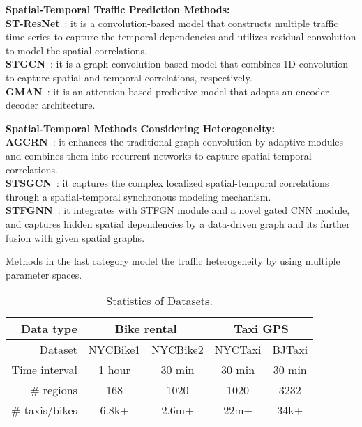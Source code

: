 \documentclass[letterpaper]{article} \usepackage{aaai23}  \usepackage{times}  \usepackage{helvet}  \usepackage{courier}  \usepackage[hyphens]{url}  \usepackage{graphicx} \urlstyle{rm} \def\UrlFont{\rm}  \usepackage{natbib}  \usepackage{caption} \frenchspacing  \setlength{\pdfpagewidth}{8.5in} \setlength{\pdfpageheight}{11in}
\newcommand{\bitem}[1]{\noindent \textbf{#1}}
\begin{document}
{\bf \noindent Spatial-Temporal Traffic Prediction Methods:}\\
\bitem{ST-ResNet}~\cite{zhang2017deep}: it is a convolution-based model that constructs multiple traffic time series to capture the temporal dependencies and utilizes residual convolution to model the spatial correlations.\\
\bitem{STGCN}~\cite{yu2018spatio}: it is a graph convolution-based model that combines 1D convolution to capture spatial and temporal correlations, respectively.\\
\bitem{GMAN}~\cite{zheng2020gman}: it is an attention-based predictive model that adopts an encoder-decoder architecture.\\\vspace{-0.12in}

{\bf \noindent Spatial-Temporal Methods Considering Heterogeneity:}\\
\bitem{AGCRN}~\cite{bai2020adaptive}: it enhances the traditional graph convolution by adaptive modules and combines them into recurrent networks to capture spatial-temporal correlations.\\
\bitem{STSGCN}~\cite{song2020spatial}: it captures the complex localized spatial-temporal correlations through a spatial-temporal synchronous modeling mechanism.\\
\bitem{STFGNN}~\cite{li2021spatial}: it integrates with STFGN module and a novel gated CNN module, and captures hidden spatial dependencies by a data-driven graph and its further fusion with given spatial graphs.

Methods in the last category model the traffic heterogeneity by using multiple parameter spaces.



\begin{table}[t]\small
    \centering
    \setlength{\tabcolsep}{1.5mm}
    \begin{tabular}{rcccc}
      \toprule 
      {Data type} & \multicolumn{2}{c}{Bike rental} & \multicolumn{2}{c}{Taxi GPS} \\
      \midrule
      Dataset & NYCBike1 & NYCBike2 & NYCTaxi & BJTaxi \\
      Time interval & 1 hour & 30 min & 30 min & 30 min \\
      \# regions & 168 & 1020 & 1020 & 3232 \\
      \# taxis/bikes & 6.8k+ & 2.6m+ & 22m+ & 34k+ \\
      \bottomrule
    \end{tabular}\caption{Statistics of Datasets.}\vspace{-.3cm}
    \label{tab:dataset}\end{table}
\end{document}
